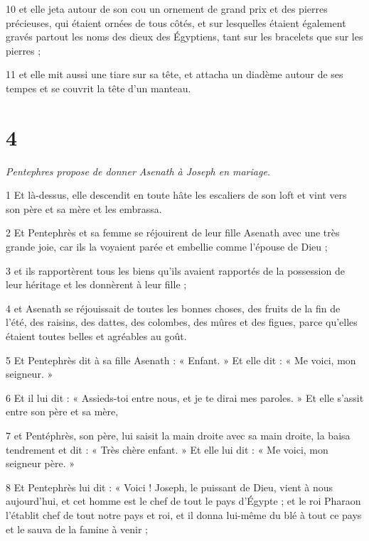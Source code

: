 \par 10 et elle jeta autour de son cou un ornement de grand prix et des pierres précieuses, qui étaient ornées de tous côtés, et sur lesquelles étaient également gravés partout les noms des dieux des Égyptiens, tant sur les bracelets que sur les pierres ;

\par 11 et elle mit aussi une tiare sur sa tête, et attacha un diadème autour de ses tempes et se couvrit la tête d'un manteau.

\chapter{4}

\textit{Pentephres propose de donner Asenath à Joseph en mariage.}

\par 1 Et là-dessus, elle descendit en toute hâte les escaliers de son loft et vint vers son père et sa mère et les embrassa.

\par 2 Et Pentephrès et sa femme se réjouirent de leur fille Asenath avec une très grande joie, car ils la voyaient parée et embellie comme l'épouse de Dieu ;

\par 3 et ils rapportèrent tous les biens qu'ils avaient rapportés de la possession de leur héritage et les donnèrent à leur fille ;

\par 4 et Asenath se réjouissait de toutes les bonnes choses, des fruits de la fin de l'été, des raisins, des dattes, des colombes, des mûres et des figues, parce qu'elles étaient toutes belles et agréables au goût.

\par 5 Et Pentephrès dit à sa fille Asenath : « Enfant. » Et elle dit : « Me voici, mon seigneur. »

\par 6 Et il lui dit : « Assieds-toi entre nous, et je te dirai mes paroles. » Et elle s'assit entre son père et sa mère,

\par 7 et Pentéphrès, son père, lui saisit la main droite avec sa main droite, la baisa tendrement et dit : « Très chère enfant. » Et elle lui dit : « Me voici, mon seigneur père. »

\par 8 Et Pentephrès lui dit : « Voici ! Joseph, le puissant de Dieu, vient à nous aujourd'hui, et cet homme est le chef de tout le pays d'Égypte ; et le roi Pharaon l'établit chef de tout notre pays et roi, et il donna lui-même du blé à tout ce pays et le sauva de la famine à venir ;

